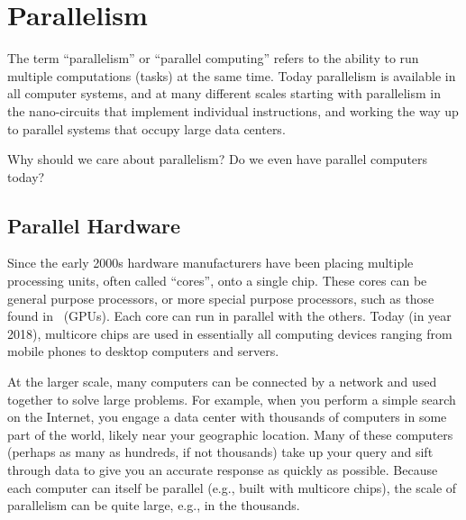 \chapter{Parallelism}
\label{ch:introduction::parallelism}

\begin{gram}
The term ``parallelism'' or ``parallel computing'' refers to the ability to run multiple computations (tasks) at the same time.
%
Today parallelism is available in all computer systems, and at many different scales starting with parallelism in the nano-circuits that implement individual instructions, and working the way up to parallel systems that occupy large data centers.  
\end{gram}

\begin{teachask}
Why should we care about parallelism?  
%
Do we even have parallel computers today? 
\end{teachask}
%

\section{Parallel Hardware}
%

\begin{gram}
Since the early 2000s
hardware manufacturers have been placing multiple processing units,
often called ``cores'', onto a single chip.  These cores can be
general purpose processors, or more special purpose processors, such as
those found in~ (GPUs).  
%
Each core can run in parallel with the others.
%
Today (in year 2018), multicore chips are used in essentially all
computing devices ranging from mobile phones to desktop computers and
servers.
\end{gram}

\begin{gram}
At the larger scale, many computers can be connected by a network and
used together to solve large problems.  For example, when you perform
a simple search on the Internet, you engage a data center with
thousands of computers in some part of the world, likely near your
geographic location.
%
Many of these computers (perhaps as many as hundreds, if not
thousands) take up your query and sift through data to give you an
accurate response as quickly as possible.
%
Because each computer can itself be parallel (e.g., built with
multicore chips), the scale of parallelism can be quite large, e.g.,
in the thousands.
\end{gram}

